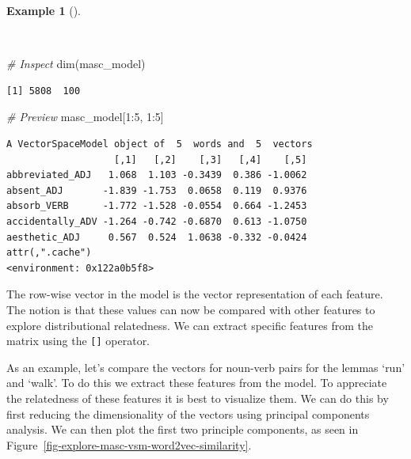 \documentclass[
  letterpaper,
  krantz1]{latex/krantz-mod}
\newenvironment{Shaded}{\begin{snugshade}}{\end{snugshade}}
\newcommand{\CommentTok}[1]{\textcolor[rgb]{0.00,0.00,0.00}{\textit{#1}}}
\newcommand{\DecValTok}[1]{\textcolor[rgb]{0.00,0.00,0.00}{#1}}
\newcommand{\FunctionTok}[1]{\textcolor[rgb]{0.00,0.00,0.00}{#1}}
\newcommand{\NormalTok}[1]{\textcolor[rgb]{0.00,0.00,0.00}{#1}}
\newcommand{\SpecialCharTok}[1]{\textcolor[rgb]{0.00,0.00,0.00}{#1}}
\theoremstyle{definition}
\newtheorem{example}{Example}[chapter]
\theoremstyle{definition}
\theoremstyle{remark}
\begin{document}
\begin{example}[]\protect\hypertarget{exm-explore-masc-vsm-word2vec-vector-object}{}\label{exm-explore-masc-vsm-word2vec-vector-object}

~

\begin{Shaded}
\begin{Highlighting}[numbers=left,,]
\CommentTok{\# Inspect}
\FunctionTok{dim}\NormalTok{(masc\_model)}
\end{Highlighting}
\end{Shaded}

\begin{verbatim}
[1] 5808  100
\end{verbatim}

\begin{Shaded}
\begin{Highlighting}[numbers=left,,]
\CommentTok{\# Preview}
\NormalTok{masc\_model[}\DecValTok{1}\SpecialCharTok{:}\DecValTok{5}\NormalTok{, }\DecValTok{1}\SpecialCharTok{:}\DecValTok{5}\NormalTok{]}
\end{Highlighting}
\end{Shaded}

\begin{verbatim}
A VectorSpaceModel object of  5  words and  5  vectors
                   [,1]   [,2]    [,3]   [,4]    [,5]
abbreviated_ADJ   1.068  1.103 -0.3439  0.386 -1.0062
absent_ADJ       -1.839 -1.753  0.0658  0.119  0.9376
absorb_VERB      -1.772 -1.528 -0.0554  0.664 -1.2453
accidentally_ADV -1.264 -0.742 -0.6870  0.613 -1.0750
aesthetic_ADJ     0.567  0.524  1.0638 -0.332 -0.0424
attr(,".cache")
<environment: 0x122a0b5f8>
\end{verbatim}

\end{example}

The row-wise vector in the model is the vector representation of each
feature. The notion is that these values can now be compared with other
features to explore distributional relatedness. We can extract specific
features from the matrix using the \texttt{{[}{]}} operator.

As an example, let's compare the vectors for noun-verb pairs for the
lemmas `run' and `walk'. To do this we extract these features from the
model. To appreciate the relatedness of these features it is best to
visualize them. We can do this by first reducing the dimensionality of
the vectors using principal components analysis. We can then plot the
first two principle components, as seen in
Figure~\ref{fig-explore-masc-vsm-word2vec-similarity}.
\end{document}
